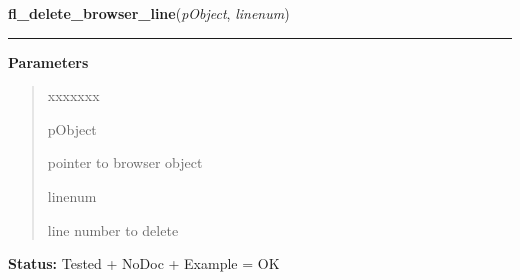     \label{xformslib:library:fl_delete_browser_line}

    \vspace{0.5ex}

\hspace{.8\funcindent}\begin{boxedminipage}{\funcwidth}

    \raggedright \textbf{fl\_delete\_browser\_line}(\textit{pObject}, \textit{linenum})

    \vspace{-1.5ex}

    \rule{\textwidth}{0.5\fboxrule}
\setlength{\parskip}{2ex}
\setlength{\parskip}{1ex}
      \textbf{Parameters}
      \vspace{-1ex}

      \begin{quote}
        \begin{Ventry}{xxxxxxx}

          \item[pObject]

          pointer to browser object

          \item[linenum]

          line number to delete

        \end{Ventry}

      \end{quote}

\textbf{Status:} Tested + NoDoc + Example = OK



    \end{boxedminipage}

    \label{xformslib:library:fl_replace_browser_line}

    \vspace{0.5ex}

